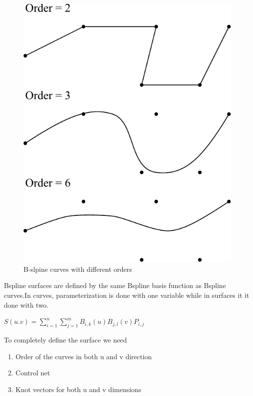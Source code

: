         \begin{figure}[htbp]
	\includegraphics{BSPORD.pdf}
            \caption{B-slpine curves with different orders}
            \label{bsporder}
        \end{figure}


            Bspline surfaces are defined by the same Bspline basis function
            as Bspline curves.In curves, parameterization is done with one
            variable while in surfaces it it done with two.

            $ S(u.v)  = \sum_{i=1}^{n}\sum_{j=1}^{m}B_{i,k}(u)B_{j,l}(v)P_{i,j}$

            To completely define the surface we need

                \begin{enumerate}
                \item
                Order of the curves in both u and v direction
                \item
                Control net
                \item
                Knot vectors for both u and v dimensions
                \end{enumerate}




